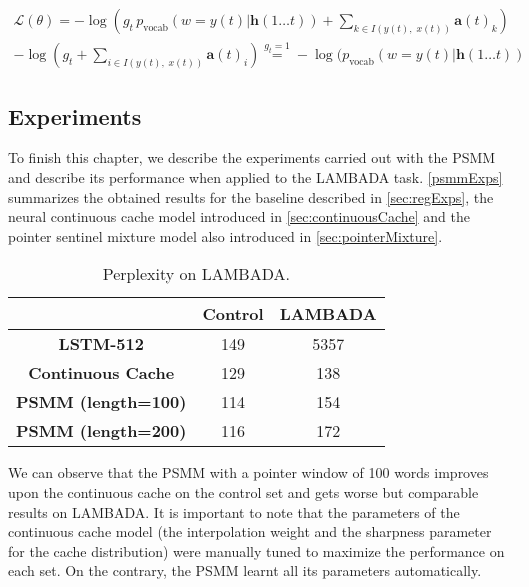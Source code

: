 \begin{equation} \label{eq:psmmGrad}
\begin{gathered}
\mathcal{L}(\theta) = -\log(g_t \, p_{\text{vocab}}(w=y(t)|\mathbf{h}(1\ldots t)) + \sum_{k \in I(y(t), \; x(t))}\mathbf{a}(t)_k) \\
-\log(g_t + \sum_{i \in I(y(t), \; x(t))}\mathbf{a}(t)_i) \stackrel{g_t=1}{=} -\log(p_{\text{vocab}}(w=y(t)|\mathbf{h}(1\ldots t))
\end{gathered}
\end{equation}

\subsection{Experiments}

To finish this chapter, we describe the experiments carried out with the PSMM and describe its performance when applied to the LAMBADA task. \autoref{psmmExps} summarizes the obtained results for the baseline described in \autoref{sec:regExps}, the neural continuous cache model introduced in \autoref{sec:continuousCache} and the pointer sentinel mixture model also introduced in \autoref{sec:pointerMixture}.

\begin{table}[H]
	\centering
	\begin{tabular}{c|c|c|}
		\cline{2-3}
		\multicolumn{1}{l|}{}                            & \textbf{Control} & \textbf{LAMBADA} \\ \hline
		\multicolumn{1}{|c|}{\textbf{LSTM-512} \cite{paperno2016lambada}}          & 149              & 5357             \\ \hline
		\multicolumn{1}{|c|}{\textbf{Continuous Cache} \cite{grave2016improving}}               & 129              & 138              \\ \hline
		\multicolumn{1}{|c|}{\textbf{PSMM (length=100)}} & 114              & 154              \\ \hline
		\multicolumn{1}{|c|}{\textbf{PSMM (length=200)}} & 116              & 172              \\ \hline
	\end{tabular}
	\caption{Perplexity on LAMBADA.}
	\label{psmmExps}
\end{table}

We can observe that the PSMM with a pointer window of 100 words improves upon the continuous cache on the control set and gets worse but comparable results on LAMBADA. It is important to note that the parameters of the continuous cache model (the interpolation weight and the sharpness parameter for the cache distribution) were manually tuned to maximize the performance on each set. On the contrary, the PSMM learnt all its parameters automatically.

